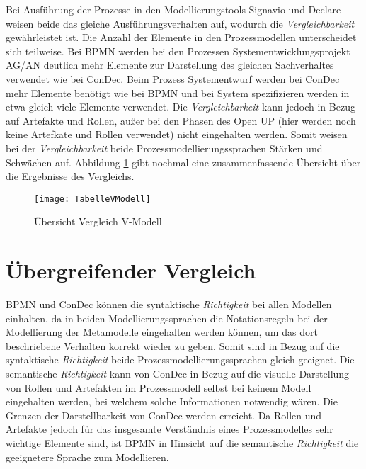 Bei Ausführung der Prozesse in den Modellierungstools Signavio und Declare weisen beide das gleiche Ausführungsverhalten auf, wodurch die \textit{Vergleichbarkeit} gewährleistet ist. \newline
Die Anzahl der Elemente in den Prozessmodellen unterscheidet sich teilweise. Bei BPMN werden bei den Prozessen Systementwicklungsprojekt AG/AN deutlich mehr Elemente zur Darstellung des gleichen Sachverhaltes verwendet wie bei ConDec. Beim Prozess Systementwurf werden bei ConDec mehr Elemente benötigt wie bei BPMN und bei System spezifizieren werden in etwa gleich viele Elemente verwendet.\newline
Die \textit{Vergleichbarkeit} kann jedoch in Bezug auf Artefakte und Rollen, außer bei den Phasen des Open UP (hier werden noch keine Artefkate und Rollen verwendet) nicht eingehalten werden.\newline
Somit weisen bei der \textit{Vergleichbarkeit} beide Prozessmodellierungssprachen Stärken und Schwächen auf. \newline
Abbildung \ref{fig:TabelleVModell} gibt nochmal eine zusammenfassende Übersicht über die Ergebnisse des Vergleichs. 


\begin{figure}[!htbp]
\begin{center}
  \texttt{[image: TabelleVModell]} %
  \caption{Übersicht Vergleich V-Modell}
  \label{fig:TabelleVModell}
\end{center}
\end{figure}


\section{Übergreifender Vergleich}

BPMN und ConDec können die syntaktische \textit{Richtigkeit} bei allen Modellen einhalten, da in beiden Modellierungssprachen die Notationsregeln bei der Modellierung der Metamodelle eingehalten werden können, um das dort beschriebene Verhalten korrekt wieder zu geben. Somit sind in Bezug auf die syntaktische \textit{Richtigkeit} beide Prozessmodellierungssprachen gleich geeignet.\newline
Die semantische \textit{Richtigkeit} kann von ConDec in Bezug auf die visuelle Darstellung von Rollen und Artefakten im Prozessmodell selbst bei keinem Modell eingehalten werden, bei welchem solche Informationen notwendig wären. Die Grenzen der Darstellbarkeit von ConDec  werden erreicht. Da Rollen und Artefakte jedoch für das insgesamte Verständnis eines Prozessmodelles sehr wichtige Elemente sind, ist BPMN in Hinsicht auf die semantische \textit{Richtigkeit} die geeignetere Sprache zum Modellieren.  \newline


